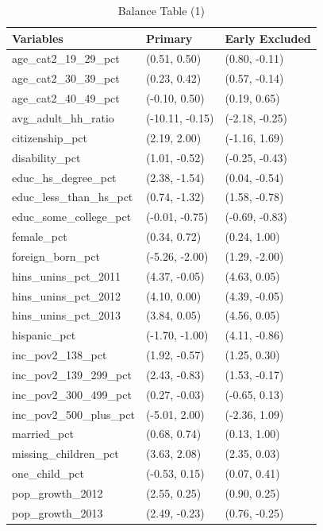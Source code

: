 \documentclass[12pt]{article}
\begin{document}
\begin{table}[ht]
\centering
\begin{tabular}{lll}
  \toprule
Variables & Primary & Early Excluded \\ 
  \midrule
age\_cat2\_19\_29\_pct & (0.51, 0.50) & (0.80, -0.11) \\ 
  age\_cat2\_30\_39\_pct & (0.23, 0.42) & (0.57, -0.14) \\ 
  age\_cat2\_40\_49\_pct & (-0.10, 0.50) & (0.19, 0.65) \\ 
  avg\_adult\_hh\_ratio & (-10.11, -0.15) & (-2.18, -0.25) \\ 
  citizenship\_pct & (2.19, 2.00) & (-1.16, 1.69) \\ 
  disability\_pct & (1.01, -0.52) & (-0.25, -0.43) \\ 
  educ\_hs\_degree\_pct & (2.38, -1.54) & (0.04, -0.54) \\ 
  educ\_less\_than\_hs\_pct & (0.74, -1.32) & (1.58, -0.78) \\ 
  educ\_some\_college\_pct & (-0.01, -0.75) & (-0.69, -0.83) \\ 
  female\_pct & (0.34, 0.72) & (0.24, 1.00) \\ 
  foreign\_born\_pct & (-5.26, -2.00) & (1.29, -2.00) \\ 
  hins\_unins\_pct\_2011 & (4.37, -0.05) & (4.63, 0.05) \\ 
  hins\_unins\_pct\_2012 & (4.10, 0.00) & (4.39, -0.05) \\ 
  hins\_unins\_pct\_2013 & (3.84, 0.05) & (4.56, 0.05) \\ 
  hispanic\_pct & (-1.70, -1.00) & (4.11, -0.86) \\ 
  inc\_pov2\_138\_pct & (1.92, -0.57) & (1.25, 0.30) \\ 
  inc\_pov2\_139\_299\_pct & (2.43, -0.83) & (1.53, -0.17) \\ 
  inc\_pov2\_300\_499\_pct & (0.27, -0.03) & (-0.65, 0.13) \\ 
  inc\_pov2\_500\_plus\_pct & (-5.01, 2.00) & (-2.36, 1.09) \\ 
  married\_pct & (0.68, 0.74) & (0.13, 1.00) \\ 
  missing\_children\_pct & (3.63, 2.08) & (2.35, 0.03) \\ 
  one\_child\_pct & (-0.53, 0.15) & (0.07, 0.41) \\ 
  pop\_growth\_2012 & (2.55, 0.25) & (0.90, 0.25) \\ 
  pop\_growth\_2013 & (2.49, -0.23) & (0.76, -0.25) \\ 
   \bottomrule
\end{tabular}
    \caption{Balance Table (1)}
    \label{tab:baltab1}
\end{table}
\end{document}
